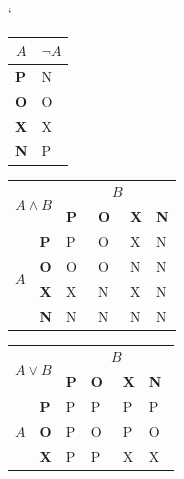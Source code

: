 \documentclass[a4paper, 11pt]{article}
\begin{document}
\begin{table}[h]

    \catcode`
     \centering
   
\begin{tabular}{|l|l|}
\hline
\multicolumn{1}{|c|}{$A$} & \multicolumn{1}{c|}{$\neg A$}\\ \hline
\textbf{P}                       & N                     \\ \hline
\textbf{O}                       & O~\\ \hline
\textbf{X}                       & X                     \\ \hline
\textbf{N}                       & P                     \\ \hline
\end{tabular}
\begin{tabular}{|l|l|l|l|l|l|}
\hline
\multicolumn{2}{|c|}{\multirow{2}{*}{$A \wedge B $}} & \multicolumn{4}{c|}{$B$}                            \\ \cline{3-6} 
\multicolumn{2}{|c|}{}                    & \textbf{P} & \textbf{O} & \textbf{X} & \textbf{N}   \\ \hline
\multirow{4}{*}{$A$}      & \textbf{P}      & P          & O~& X         & N            \\ \cline{2-6} 
                        & \textbf{O}      & O~& O~& N         & N            \\ \cline{2-6} 
                        & \textbf{X}      & X          & N           & X         & N            \\ \cline{2-6} 
                        & \textbf{N}      & N          & N           & N         & N            \\ \hline
\end{tabular}
\begin{tabular}{|l|l|l|l|l|l|}
\hline
\multicolumn{2}{|c|}{\multirow{2}{*}{$A \vee B$}} & \multicolumn{4}{c|}{$B$}                        \\ \cline{3-6} 
\multicolumn{2}{|c|}{}                    & \textbf{P} & \textbf{O} & \textbf{X} & \textbf{N}     \\ \hline
\multirow{4}{*}{$A$}      & \textbf{P}      & P           & P           & P           & P           \\ \cline{2-6} 
                        & \textbf{O}      & P           & O~& P           & O~\\ \cline{2-6} 
                        & \textbf{X}      & P           & P           & X           & X           \\ \cline{2-6} 

\end{tabular}
\end{table}
\end{document}
